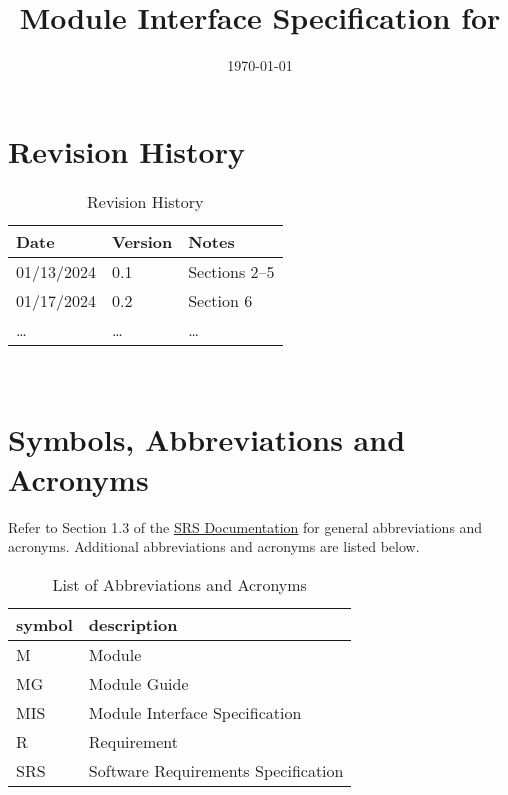 \documentclass[12pt, titlepage]{article}
\begin{document}
\title{Module Interface Specification for \progname{}}

\author{\authname}

\date{\today}

\maketitle


\section{Revision History}

\begin{table}[H]
\caption{Revision History}
\begin{tabularx}{\textwidth}{p{3cm}p{2cm}X}
\toprule {\bf Date} & {\bf Version} & {\bf Notes}\\
\midrule
01/13/2024 & 0.1 & Sections 2--5 \\
01/17/2024 & 0.2 & Section 6\\
\ldots & \ldots & \ldots \\
\bottomrule
\end{tabularx}
\end{table}

~\newpage

\section{Symbols, Abbreviations and Acronyms}
Refer to Section 1.3 of the
\href{https://github.com/PlutosCapstone/Plutos/blob/main/docs/SRS/SRS.pdf}{SRS
Documentation} for general abbreviations and acronyms. Additional abbreviations
and acronyms are listed below.


\renewcommand{\arraystretch}{1.2}
\begin{table}[H]
\caption{List of Abbreviations and Acronyms}
\centering
\begin{tabularx}{\textwidth}{l X} 
	\toprule		
	\textbf{symbol} & \textbf{description}\\
	\midrule 
	M & Module \\
	MG & Module Guide \\
  MIS & Module Interface Specification\\
	R & Requirement\\
	SRS & Software Requirements Specification\\
	\bottomrule
\end{tabularx}
\end{table}
\end{document}
